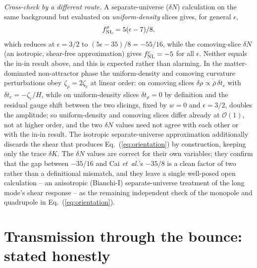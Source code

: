 \documentclass[aps,prd,reprint,superscriptaddress,showpacs,preprintnumbers,nofootinbib,longbibliography,floatfix]{revtex4-2}
\newcommand{\etal}{\textit{et~al.}}
\begin{document}
\textit{Cross-check by a different route.} A separate-universe ($\delta N$) calculation
on the same background but evaluated on \emph{uniform-density} slices gives, for general
$\epsilon$,
\begin{equation}
f_{\rm NL}^\rho=5(\epsilon-7)/8,
\end{equation}
which reduces at $\epsilon=3/2$ to $(5\epsilon-35)/8=-55/16$, while the comoving-slice
$\delta N$ (an isotropic, shear-free approximation) gives $f_{\rm NL}^c=-5$ for all
$\epsilon$. Neither equals the in-in result above, and this is expected rather than
alarming. In the matter-dominated non-attractor phase the uniform-density and comoving
curvature perturbations obey $\zeta_\rho=2\zeta_c$ at linear order: on comoving slices
$\delta\rho\propto\dot{\bar\rho}\,\delta t_c$ with $\delta t_c=-\zeta_c/H$, while on
uniform-density slices $\delta t_\rho=0$ by definition and the residual gauge shift
between the two slicings, fixed by $w=0$ and $\epsilon=3/2$, doubles the amplitude; so
uniform-density and comoving slices differ already at $\mathcal O(1)$, not at higher
order, and the two $\delta N$ values need not agree with each other or with the in-in
result. The isotropic separate-universe approximation additionally discards the shear
that produces Eq.~(\ref{eq:orientation}) by construction, keeping only the trace $\delta
K$. The $\delta N$ values are correct for their own variables; they confirm that the gap
between $-35/16$ and Cai \etal's $-35/8$ is a clean factor of two rather than a
definitional mismatch, and they leave a single well-posed open calculation -- an
anisotropic (Bianchi-I) separate-universe treatment of the long mode's shear response --
as the remaining independent check of the monopole and quadrupole in
Eq.~(\ref{eq:orientation}).

\section{Transmission through the bounce: stated honestly}
\end{document}
